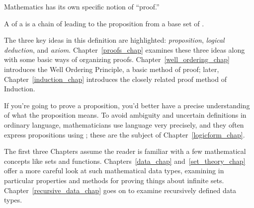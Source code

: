 Mathematics has its own specific notion of ``proof.''

\begin{definition*}
A  of a  is a chain of  leading to the proposition from a base set of .
\end{definition*}

The three key ideas in this definition are highlighted:
\emph{proposition}, \emph{logical deduction}, and \emph{axiom}.
Chapter~\ref{proofs_chap} examines these three ideas along with some
basic ways of organizing proofs.  Chapter~\ref{well_ordering_chap}
introduces the Well Ordering Principle, a basic method of proof; later,
Chapter~\ref{induction_chap} introduces the closely related proof
method of Induction.

If you're going to prove a proposition, you'd better have a precise
understanding of what the proposition means.  To avoid ambiguity and
uncertain definitions in ordinary language, mathematicians use
language very precisely, and they often express propositions using
; these are the subject of
Chapter~\ref{logicform_chap}.

The first three Chapters assume the reader is familiar with a few
mathematical concepts like sets and functions.
Chapters~\ref{data_chap} and~\ref{set_theory_chap} offer a more
careful look at such mathematical data types, examining in particular
properties and methods for proving things about infinite sets.
Chapter~\ref{recursive_data_chap} goes on to examine recursively
defined data types.

\iffalse
Number theory is the study of properties of the integers.  This part
of the text ends with Chapter~\ref{number_theory_chap} on Number
theory because there are lots of easy-to-state and
interesting-to-prove properties of numbers.  This subject was once
thought to have few, if any, practical applications, but it has turned
out to have multiple applications in Computer Science.  For example,
most modern data encryption methods are based on Number theory.
\fi

\endinput
